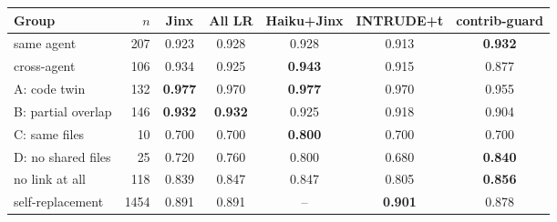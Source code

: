 \begin{tabular}{lrccccc}\toprule
Group & $n$ & \cellcolor{jinxrow}Jinx & All LR & Haiku+Jinx & INTRUDE+t & contrib-guard \\\midrule
same agent & 207 & \cellcolor{jinxrow}0.923 & 0.928 & 0.928 & 0.913 & \textbf{0.932} \\
cross-agent & 106 & \cellcolor{jinxrow}0.934 & 0.925 & \textbf{0.943} & 0.915 & 0.877 \\
A: code twin & 132 & \cellcolor{jinxrow}\textbf{0.977} & 0.970 & \textbf{0.977} & 0.970 & 0.955 \\
B: partial overlap & 146 & \cellcolor{jinxrow}\textbf{0.932} & \textbf{0.932} & 0.925 & 0.918 & 0.904 \\
C: same files & 10 & \cellcolor{jinxrow}0.700 & 0.700 & \textbf{0.800} & 0.700 & 0.700 \\
D: no shared files & 25 & \cellcolor{jinxrow}0.720 & 0.760 & 0.800 & 0.680 & \textbf{0.840} \\
no link at all & 118 & \cellcolor{jinxrow}0.839 & 0.847 & 0.847 & 0.805 & \textbf{0.856} \\
self-replacement & 1454 & \cellcolor{jinxrow}0.891 & 0.891 & -- & \textbf{0.901} & 0.878 \\
\bottomrule\end{tabular}
